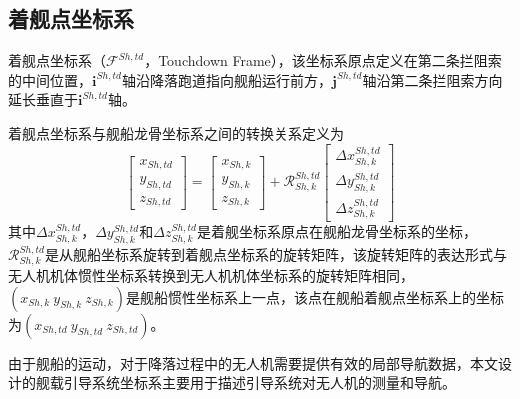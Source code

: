 \subsection{着舰点坐标系}
着舰点坐标系（$\mathcal{F}^{Sh,td}$，Touchdown Frame），该坐标系原点定义在第二条拦阻索的中间位置，$\mathbf{i}^{Sh,td}$轴沿降落跑道指向舰船运行前方，$\mathbf{j}^{Sh,td}$轴沿第二条拦阻索方向延长垂直于$\mathbf{i}^{Sh,td}$轴。

着舰点坐标系与舰船龙骨坐标系之间的转换关系定义为
\begin{equation}
	\begin{bmatrix} x_{Sh,td} \\ y_{Sh,td} \\z_{Sh,td} \end{bmatrix} = \begin{bmatrix} x_{Sh,k} \\ y_{Sh,k} \\z_{Sh,k} \end{bmatrix} +\mathcal{R}_{Sh,k}^{Sh,td} \begin{bmatrix} \Delta x_{Sh,k}^{Sh,td} \\ \Delta y_{Sh,k}^{Sh,td} \\ \Delta z_{Sh,k}^{Sh,td} 
	\end{bmatrix}
\end{equation}
其中$\Delta x_{Sh,k}^{Sh,td}$，$\Delta y_{Sh,k}^{Sh,td}$和$\Delta z_{Sh,k}^{Sh,td}$是着舰坐标系原点在舰船龙骨坐标系的坐标，$\mathcal{R}_{Sh,k}^{Sh,td}$是从舰船坐标系旋转到着舰点坐标系的旋转矩阵，该旋转矩阵的表达形式与无人机机体惯性坐标系转换到无人机机体坐标系的旋转矩阵相同，$(x_{Sh,k}\ y_{Sh,k}\ z_{Sh,k})$是舰船惯性坐标系上一点，该点在舰船着舰点坐标系上的坐标为$(x_{Sh,td}\ y_{Sh,td}\ z_{Sh,td})$。


由于舰船的运动，对于降落过程中的无人机需要提供有效的局部导航数据，本文设计的舰载引导系统坐标系主要用于描述引导系统对无人机的测量和导航。
